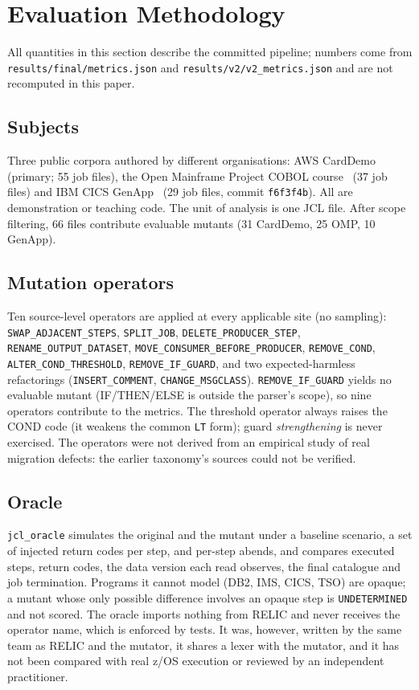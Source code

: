 \section{Evaluation Methodology}
\label{sec:method}

All quantities in this section describe the committed pipeline; numbers come
from \texttt{results/final/metrics.json} and \texttt{results/v2/v2\_metrics.json}
and are not recomputed in this paper.

\subsection{Subjects}
Three public corpora authored by different organisations: AWS
CardDemo~\cite{carddemo} (primary; 55 job files), the Open Mainframe Project
COBOL course~\cite{ompcourse} (37 job files) and IBM CICS
GenApp~\cite{genapp} (29 job files, commit \texttt{f6f3f4b}). All are
demonstration or teaching code. The unit of analysis is one JCL file. After
scope filtering, 66 files contribute evaluable mutants (31 CardDemo, 25 OMP,
10 GenApp).

\subsection{Mutation operators}
Ten source-level operators are applied at every applicable site (no sampling):
\texttt{SWAP\_ADJACENT\_STEPS}, \texttt{SPLIT\_JOB},
\texttt{DELETE\_PRODUCER\_STEP}, \texttt{RENAME\_OUTPUT\_DATASET},
\texttt{MOVE\_CONSUMER\_BEFORE\_PRODUCER}, \texttt{REMOVE\_COND},
\texttt{ALTER\_COND\_THRESHOLD}, \texttt{REMOVE\_IF\_GUARD}, and two expected-harmless
refactorings (\texttt{INSERT\_COMMENT}, \texttt{CHANGE\_MSGCLASS}).
\texttt{REMOVE\_IF\_GUARD} yields no evaluable mutant (IF/THEN/ELSE is outside the
parser's scope), so nine operators contribute to the metrics. The threshold
operator always raises the COND code (it weakens the common \texttt{LT} form);
guard \emph{strengthening} is never exercised. The operators were not derived
from an empirical study of real migration defects: the earlier taxonomy's
sources could not be verified.

\subsection{Oracle}
\texttt{jcl\_oracle} simulates the original and the mutant under a baseline
scenario, a set of injected return codes per step, and per-step abends, and
compares executed steps, return codes, the data version each read observes, the
final catalogue and job termination. Programs it cannot model (DB2, IMS, CICS,
TSO) are opaque; a mutant whose only possible difference involves an opaque step
is \texttt{UNDETERMINED} and not scored. The oracle imports nothing from RELIC
and never receives the operator name, which is enforced by tests. It was,
however, written by the same team as RELIC and the mutator, it shares a lexer
with the mutator, and it has not been compared with real z/OS execution or
reviewed by an independent practitioner.

